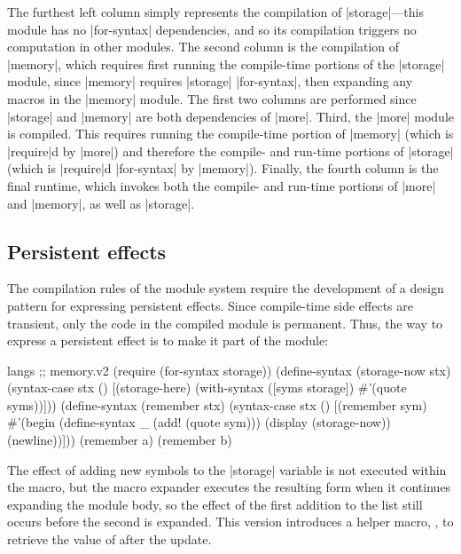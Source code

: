 \begin{schemeregion}
The furthest left column simply represents the compilation of
\scheme|storage|---this module has no \scheme|for-syntax|
dependencies, and so its compilation triggers no computation in other
modules.  The second column is the compilation of \scheme|memory|,
which requires first running the compile-time portions of the
\scheme|storage| module, since \scheme|memory| requires
\scheme|storage| \scheme|for-syntax|,
then expanding any macros in the \scheme|memory| module. The first two
columns are performed since \scheme|storage| and \scheme|memory| are
both dependencies of \scheme|more|.
Third, the \scheme|more| module is compiled.  This requires running
the compile-time portion of \scheme|memory| (which is
\scheme|require|d by \scheme|more|) and therefore the compile- and run-time
portions of \scheme|storage| (which is \scheme|require|d
\scheme|for-syntax| by \scheme|memory|).  Finally, the fourth column
is the final runtime, which invokes both the compile- and run-time
portions of \scheme|more| and \scheme|memory|, as well as
\scheme|storage|.  

\subsection{Persistent effects}
\label{sect:syntax:persistent}

The compilation rules of the module system require the development of
 a design pattern for expressing persistent effects.
%
Since compile-time side effects are transient, only the code in the compiled
module is permanent. Thus, the way to express a persistent effect is
to make it part of the module:
\begin{schemedisplay}
langs ;; memory.v2
(require (for-syntax storage))
(define-syntax (storage-now stx)
  (syntax-case stx ()
    [(storage-here)
     (with-syntax ([syms storage])
       #'(quote syms))]))
(define-syntax (remember stx)
  (syntax-case stx ()
    [(remember sym)
     #'(begin (define-syntax _ (add! (quote sym)))
	      (display (storage-now))
	      (newline))]))
(remember a)
(remember b)
\end{schemedisplay}
The effect of adding new symbols to the \scheme|storage| variable
 is not executed within the macro, but the macro expander
executes the resulting  form when it continues
expanding the module body, so the effect of the first addition to the
list still occurs before the second  is
expanded. This version introduces a helper macro,
, to retrieve the value of  after
the update.


\end{schemeregion}
